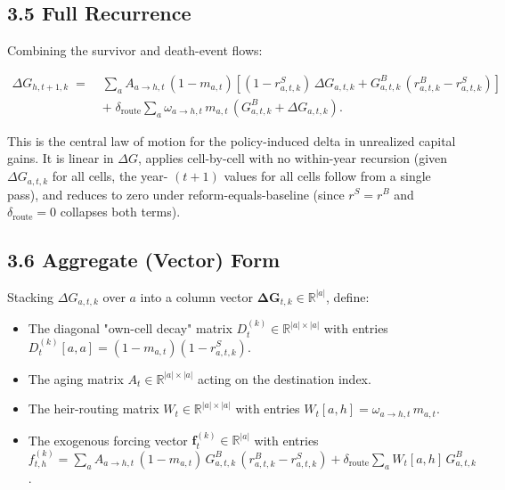 \documentclass[11pt]{article}
\begin{document}
\subsection*{3.5 Full Recurrence}

Combining the survivor and death-event flows:

\[
\boxed{
\begin{aligned}
\Delta G_{h, t+1, k}
\;=\;&
\sum_a A_{a \to h, t}\,(1 - m_{a,t})\!\left[
(1 - r^S_{a,t,k})\,\Delta G_{a,t,k}
+ G^B_{a,t,k}\,(r^B_{a,t,k} - r^S_{a,t,k})
\right] \\
&+\; \delta_{\text{route}}
\sum_a \omega_{a \to h, t}\,m_{a,t}\,(G^B_{a,t,k} + \Delta G_{a,t,k}).
\end{aligned}
}
\]

This is the central law of motion for the policy-induced delta in unrealized capital gains. It is linear in $\Delta G$, applies cell-by-cell with no within-year recursion (given $\Delta G_{a,t,k}$ for all cells, the year- $(t+1)$ values for all cells follow from a single pass), and reduces to zero under reform-equals-baseline (since $r^S = r^B$ and $\delta_{\text{route}} =
0$ collapses both terms).

\subsection*{3.6 Aggregate (Vector) Form}

Stacking $\Delta G_{a, t, k}$ over $a$ into a column vector $\boldsymbol{\Delta
G}_{t, k} \in \mathbb{R}^{|a|}$, define:

\begin{itemize}
  \item The diagonal "own-cell decay" matrix
    $D_t^{(k)} \in \mathbb{R}^{|a| \times |a|}$ with entries
    $D_t^{(k)}[a,a] = (1 - m_{a,t})(1 - r^S_{a,t,k})$.
\end{itemize}
\begin{itemize}
  \item The aging matrix $A_t \in \mathbb{R}^{|a| \times |a|}$ acting on the
    destination index.
\end{itemize}
\begin{itemize}
  \item The heir-routing matrix $W_t \in \mathbb{R}^{|a| \times |a|}$ with entries
    $W_t[a, h] = \omega_{a \to h, t}\,m_{a,t}$.
\end{itemize}
\begin{itemize}
  \item The exogenous forcing vector
    $\boldsymbol{f}_{t}^{(k)} \in \mathbb{R}^{|a|}$ with entries
    $f^{(k)}_{t,h} = \sum_a A_{a \to h, t}\,(1 - m_{a,t})\,G^B_{a,t,k}\,(r^B_{a,t,k}
  - r^S_{a,t,k}) + \delta_{\text{route}} \sum_a W_t[a, h]\,G^B_{a,t,k}$.
\end{itemize}
\end{document}
